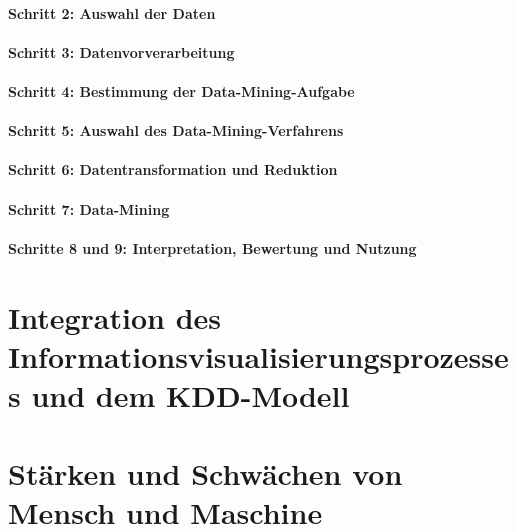         \paragraph{Schritt 2: Auswahl der Daten} %

        \paragraph{Schritt 3: Datenvorverarbeitung} %

        \paragraph{Schritt 4: Bestimmung der Data-Mining-Aufgabe} %

        \paragraph{Schritt 5: Auswahl des Data-Mining-Verfahrens} %

        \paragraph{Schritt 6: Datentransformation und Reduktion} %

        \paragraph{Schritt 7: Data-Mining} %

        \paragraph{Schritte 8 und 9: Interpretation, Bewertung und Nutzung} %

    \section{Integration des Informationsvisualisierungsprozesses und dem KDD-Modell} %

    \section{Stärken und Schwächen von Mensch und Maschine} %

